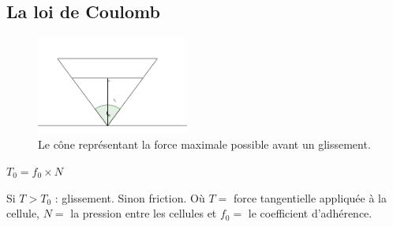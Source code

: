 \documentclass{beamer}
\begin{document}
\subsection{La loi de Coulomb}
\begin{frame}
  \begin{figure}
    \begin{center}
      \includegraphics[width=5cm]{Images/friction.png}
    \end{center}
    \caption{Le cône représentant la force maximale possible avant un glissement.}
  \end{figure}
  \begin{center}
    $T_0 = f_0 \times N$
  \end{center}
  Si $T > T_0$ : glissement. Sinon friction. \smallbreak
  Où $T = $ force tangentielle appliquée à la cellule, $N = $ la pression entre les cellules et $f_0 = $ le coefficient d'adhérence.
\end{frame}
\end{document}
